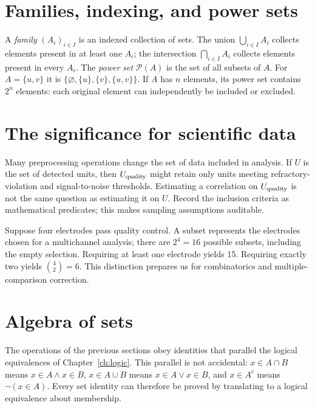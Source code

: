 \section{Families, indexing, and power sets}
A \emph{family} $(A_i)_{i\in I}$ is an indexed collection of sets. The union $\bigcup_{i\in I}A_i$ collects elements present in at least one $A_i$; the intersection $\bigcap_{i\in I}A_i$ collects elements present in every $A_i$. The \emph{power set} $\mathcal P(A)$ is the set of all subsets of $A$. For $A=\{u,v\}$ it is $\{\varnothing,\{u\},\{v\},\{u,v\}\}$. If $A$ has $n$ elements, its power set contains $2^n$ elements: each original element can independently be included or excluded.

\section{The significance for scientific data}
Many preprocessing operations change the set of data included in analysis. If $U$ is the set of detected units, then $U_{\rm quality}$ might retain only units meeting refractory-violation and signal-to-noise thresholds. Estimating a correlation on $U_{\rm quality}$ is not the same question as estimating it on $U$. Record the inclusion criteria as mathematical predicates; this makes sampling assumptions auditable.

\begin{workedexample}
Suppose four electrodes pass quality control. A subset represents the electrodes chosen for a multichannel analysis; there are $2^4=16$ possible subsets, including the empty selection. Requiring at least one electrode yields 15. Requiring exactly two yields $\binom42=6$. This distinction prepares us for combinatorics and multiple-comparison correction.
\end{workedexample}
\section{Algebra of sets}
The operations of the previous sections obey identities that parallel the logical equivalences of Chapter~\ref{ch:logic}. This parallel is not accidental: $x\in A\cap B$ means $x\in A\land x\in B$, $x\in A\cup B$ means $x\in A\lor x\in B$, and $x\in A^c$ means $\neg(x\in A)$. Every set identity can therefore be proved by translating to a logical equivalence about membership.


